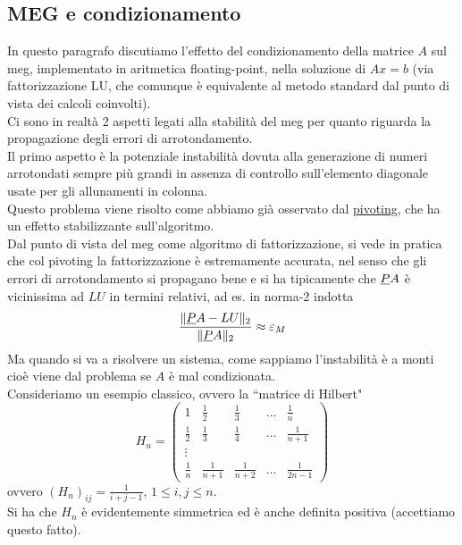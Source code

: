 \documentclass[12pt,a4paper]{article}
\DeclarePairedDelimiter{\norma}{\lVert}{\rVert}
\begin{document}
\subsection{MEG e condizionamento}
In questo paragrafo discutiamo l'effetto del condizionamento della matrice $A$ sul meg, implementato in aritmetica floating-point, nella soluzione di $Ax=b$ (via fattorizzazione LU, che comunque è equivalente al metodo standard dal punto di vista dei calcoli coinvolti). \\
Ci sono in realtà 2 aspetti legati alla stabilità del meg per quanto riguarda la propagazione degli errori di arrotondamento.\\
Il primo aspetto è la potenziale instabilità dovuta alla generazione di numeri arrotondati sempre più grandi in assenza di controllo sull'elemento diagonale usate per gli allunamenti in colonna. \\
Questo problema viene risolto come abbiamo già osservato dal \uline{pivoting}, che ha un effetto stabilizzante sull'algoritmo. \\
Dal punto di vista del meg come algoritmo di fattorizzazione, si vede in pratica che col pivoting la fattorizzazione è estremamente accurata, nel senso che gli errori di arrotondamento si propagano bene e si ha tipicamente che $\uline{P}A$ è vicinissima ad $LU$ in termini relativi, ad es. in norma-2 indotta
\begin{equation*}
    \frac{\norma{\uline{P}A-LU}_2}{\norma{\uline{P}A}_2} \approx \varepsilon_M
\end{equation*}
Ma quando si va a risolvere un sistema, come sappiamo l'instabilità è a monti cioè viene dal problema se $A$ è mal condizionata.\\
Consideriamo un esempio classico, ovvero la ``matrice di Hilbert"
\begin{equation*}
    H_n=\begin{pmatrix}
        1 & \frac{1}{2} & \frac{1}{3} & \dots & \frac{1}{n} \\ 
        \frac{1}{2} & \frac{1}{3} & \frac{1}{4} & \dots & \frac{1}{n+1} \\ 
        \vdots &  &  &  &  \\ 
        \frac{1}{n} & \frac{1}{n+1} & \frac{1}{n+2} & \dots & \frac{1}{2n-1}
    \end{pmatrix}
\end{equation*}
ovvero $(H_n)_{ij} = \frac{1}{i+j-1}$, $1\leq i,j \leq n$. \\
Si ha che $H_n$ è evidentemente simmetrica ed è anche definita positiva (accettiamo questo fatto). \\
\end{document}
